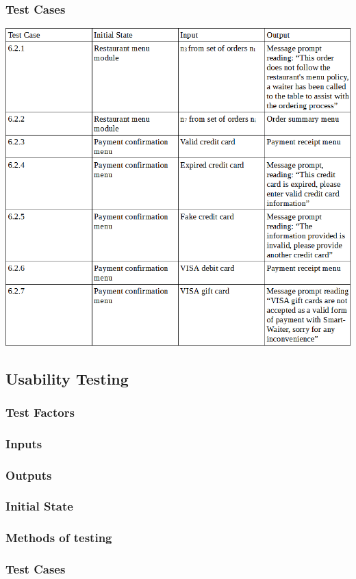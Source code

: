 \documentclass[12pt]{article}
\begin{document}
\subsubsection{Test Cases}
\includegraphics[width=\textwidth,height=\textheight,keepaspectratio]{orderTransactionTC.png}

\subsection{Usability Testing}
\subsubsection{Test Factors}
\subsubsection{Inputs}
\subsubsection{Outputs}
\subsubsection{Initial State}
\subsubsection{Methods of testing}
\subsubsection{Test Cases}
\end{document}
